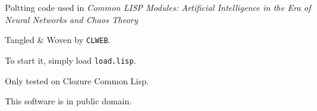 Poltting code used in {\it Common LISP Modules: Artificial Intelligence in the Era of Neural Networks and Chaos Theory}

Tangled \& Woven by {\tt CLWEB}.

To start it, simply load {\tt load.lisp}.

Only tested on Clozure Common Lisp.

This software is in public domain.

\bye
